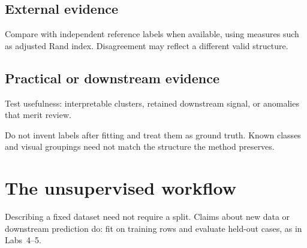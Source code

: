 \subsection{External evidence}
Compare with independent reference labels when available, using measures such as adjusted Rand index. Disagreement may reflect a different valid structure.

\subsection{Practical or downstream evidence}
Test usefulness: interpretable clusters, retained downstream signal, or anomalies that merit review.

\begin{pitfall}
Do not invent labels after fitting and treat them as ground truth. Known classes and visual groupings need not match the structure the method preserves.
\end{pitfall}

\section{The unsupervised workflow}

\begin{mlfigure}
\end{mlfigure}

Describing a fixed dataset need not require a split. Claims about new data or downstream prediction do: fit on training rows and evaluate held-out cases, as in Labs~4--5.

